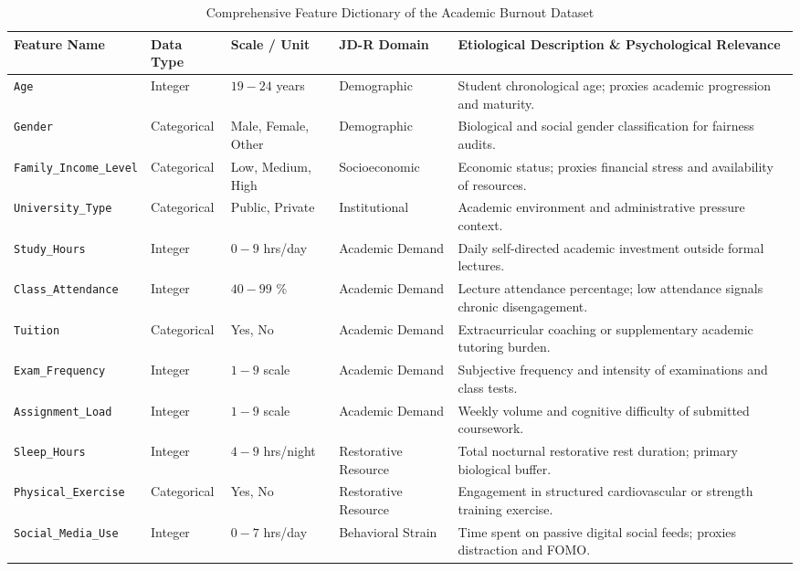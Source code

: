 \documentclass[12pt,a4paper,oneside]{report}
\begin{document}
\begin{table}[H]
\centering
\caption{Comprehensive Feature Dictionary of the Academic Burnout Dataset}
\label{tab:feature_dictionary}
\scriptsize
\begin{tabularx}{\textwidth}{p{2.8cm}p{1.4cm}p{1.6cm}p{2.2cm}X}
\toprule
\textbf{Feature Name} & \textbf{Data Type} & \textbf{Scale / Unit} & \textbf{JD-R Domain} & \textbf{Etiological Description \& Psychological Relevance} \\
\midrule
\texttt{Age} & Integer & $19 - 24$ years & Demographic & Student chronological age; proxies academic progression and maturity. \\
\texttt{Gender} & Categorical & Male, Female, Other & Demographic & Biological and social gender classification for fairness audits. \\
\texttt{Family\_Income\_Level} & Categorical & Low, Medium, High & Socioeconomic & Economic status; proxies financial stress and availability of resources. \\
\texttt{University\_Type} & Categorical & Public, Private & Institutional & Academic environment and administrative pressure context. \\
\texttt{Study\_Hours} & Integer & $0 - 9$ hrs/day & Academic Demand & Daily self-directed academic investment outside formal lectures. \\
\texttt{Class\_Attendance} & Integer & $40 - 99$ \% & Academic Demand & Lecture attendance percentage; low attendance signals chronic disengagement. \\
\texttt{Tuition} & Categorical & Yes, No & Academic Demand & Extracurricular coaching or supplementary academic tutoring burden. \\
\texttt{Exam\_Frequency} & Integer & $1 - 9$ scale & Academic Demand & Subjective frequency and intensity of examinations and class tests. \\
\texttt{Assignment\_Load} & Integer & $1 - 9$ scale & Academic Demand & Weekly volume and cognitive difficulty of submitted coursework. \\
\texttt{Sleep\_Hours} & Integer & $4 - 9$ hrs/night & Restorative Resource & Total nocturnal restorative rest duration; primary biological buffer. \\
\texttt{Physical\_Exercise} & Categorical & Yes, No & Restorative Resource & Engagement in structured cardiovascular or strength training exercise. \\
\texttt{Social\_Media\_Use} & Integer & $0 - 7$ hrs/day & Behavioral Strain & Time spent on passive digital social feeds; proxies distraction and FOMO. \\

\end{tabularx}
\end{table}
\end{document}
